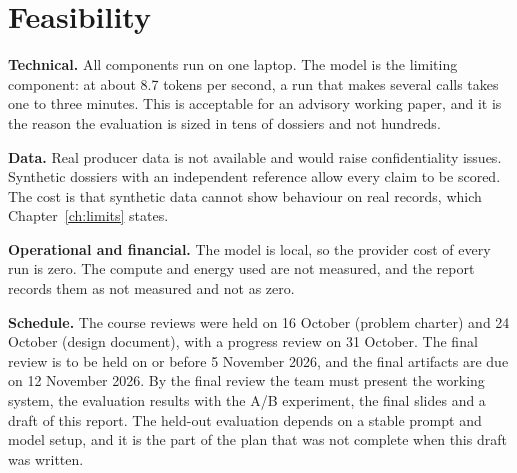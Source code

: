 \section{Feasibility}
\textbf{Technical.} All components run on one laptop. The model is the limiting component: at about
8.7 tokens per second, a run that makes several calls takes one to three minutes. This is acceptable for
an advisory working paper, and it is the reason the evaluation is sized in tens of dossiers and not hundreds.

\textbf{Data.} Real producer data is not available and would raise confidentiality issues. Synthetic
dossiers with an independent reference allow every claim to be scored. The cost is that synthetic data
cannot show behaviour on real records, which Chapter~\ref{ch:limits} states.

\textbf{Operational and financial.} The model is local, so the provider cost of every run is zero. The
compute and energy used are not measured, and the report records them as not measured and not as zero.

\textbf{Schedule.} The course reviews were held on 16 October (problem charter) and 24 October (design
document), with a progress review on 31 October. The final review is to be held on or before 5 November 2026,
and the final artifacts are due on 12 November 2026. By the final review the team must present the working system,
the evaluation results with the A/B experiment, the final slides and a draft of this report. The held-out
evaluation depends on a stable prompt and model setup, and it is the part of the plan that was not complete when
this draft was written.
